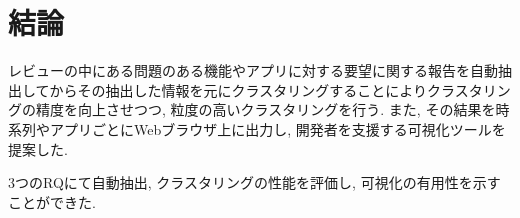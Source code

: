 \chapter{結論}
\label{chap:keturon}

レビューの中にある問題のある機能やアプリに対する要望に関する報告を自動抽出してからその抽出した情報を元にクラスタリングすることによりクラスタリングの精度を向上させつつ, 粒度の高いクラスタリングを行う. また, その結果を時系列やアプリごとにWebブラウザ上に出力し, 開発者を支援する可視化ツールを提案した.

3つのRQにて自動抽出, クラスタリングの性能を評価し, 可視化の有用性を示すことができた. 